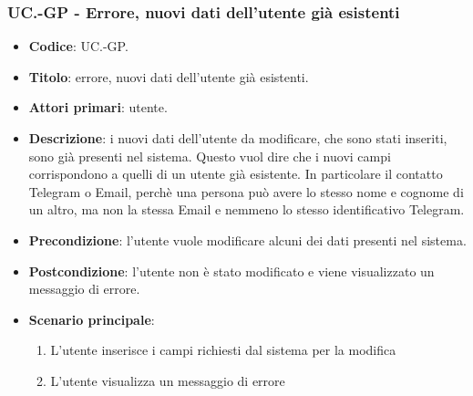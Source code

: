 		\subsubsection{UC\theuccount.\thesubuccount-GP - Errore, nuovi dati dell'utente già esistenti}

		\begin{itemize}
			\item \textbf{Codice}: UC\theuccount.\thesubuccount-GP.
			\item \textbf{Titolo}: errore, nuovi dati dell'utente già esistenti.
			\item \textbf{Attori primari}: utente.
			\item \textbf{Descrizione}: i nuovi dati dell'utente da modificare, che sono stati inseriti, sono già presenti nel sistema. Questo vuol dire che i nuovi campi corrispondono a quelli di un utente già esistente. In particolare il contatto Telegram o Email, perchè una persona può avere lo stesso nome e cognome di un altro, ma non la stessa Email e nemmeno lo stesso identificativo Telegram.
			\item \textbf{Precondizione}: l'utente vuole modificare alcuni dei dati presenti nel sistema.
			\item \textbf{Postcondizione}: l'utente non è stato modificato e viene visualizzato un messaggio di errore.
			\item \textbf{Scenario principale}:
			\begin{enumerate}
				\item L'utente inserisce i campi richiesti dal sistema per la modifica
				\item L'utente visualizza un messaggio di errore
			\end{enumerate}
		\end{itemize}

